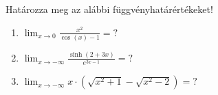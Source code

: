 \documentclass[11pt]{scrartcl}
\begin{document}
Határozza meg az alábbi függvényhatárértékeket!
\begin{enumerate}
	\item \(\displaystyle
	      \lim_{x \to 0} \frac{x^2}{\cos(x) - 1} = ?
	      \)

	\item \(\displaystyle
	      \lim_{x \to -\infty} \frac{\sinh(2 + 3x)}{e^{3x - 1}} = ?
	      \)

	\item \(\displaystyle
	      \lim_{x \to -\infty} x \cdot \left(
	      \sqrt{x^2 + 1} - \sqrt{x^2 - 2}
	      \right) = ?
	      \)
\end{enumerate}
\end{document}
